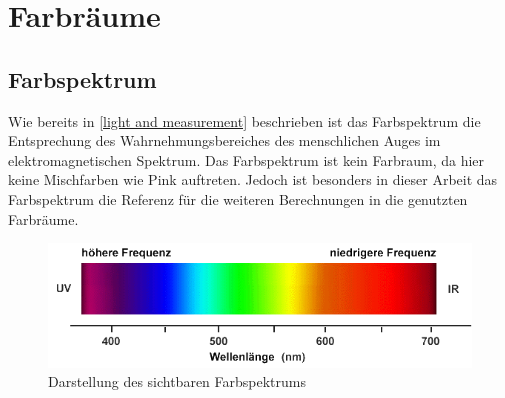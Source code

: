 \documentclass[11pt]{scrartcl}
\begin{document}
\section{Farbräume}
\subsection{Farbspektrum}
Wie bereits in \ref{light and measurement} beschrieben ist das Farbspektrum die Entsprechung des Wahrnehmungsbereiches des menschlichen
Auges im elektromagnetischen Spektrum. Das Farbspektrum ist kein Farbraum, da hier keine Mischfarben wie Pink auftreten. Jedoch ist besonders
in dieser Arbeit das Farbspektrum die Referenz für die weiteren Berechnungen in die genutzten Farbräume.
\begin{figure}[H]
    \includegraphics[width=\textwidth]{images/farbspektrum.png}
    \caption{Darstellung des sichtbaren Farbspektrums \cite{fhtEsslignen}}
\end{figure}
\noindent
\end{document}
